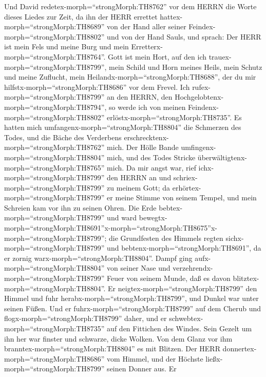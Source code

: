  Und David redetex-morph=``strongMorph:TH8762'' vor dem
HERRN die Worte dieses Liedes zur Zeit, da ihn der HERR errettet
hattex-morph=``strongMorph:TH8689'' von der Hand aller seiner
Feindex-morph=``strongMorph:TH8802'' und von der Hand Sauls, und sprach:
 Der HERR ist mein Fels und meine Burg und mein
Erretterx-morph=``strongMorph:TH8764''.  Gott ist mein Hort,
auf den ich trauex-morph=``strongMorph:TH8799'', mein Schild und Horn
meines Heils, mein Schutz und meine Zuflucht, mein
Heilandx-morph=``strongMorph:TH8688'', der du mir
hilfstx-morph=``strongMorph:TH8686'' vor dem Frevel.  Ich
rufex-morph=``strongMorph:TH8799'' an den HERRN, den
Hochgelobtenx-morph=``strongMorph:TH8794'', so werde ich von meinen
Feindenx-morph=``strongMorph:TH8802''
erlöstx-morph=``strongMorph:TH8735''.  Es hatten mich
umfangenx-morph=``strongMorph:TH8804'' die Schmerzen des Todes, und die
Bäche des Verderbens erschrecktenx-morph=``strongMorph:TH8762'' mich.
 Der Hölle Bande umfingenx-morph=``strongMorph:TH8804''
mich, und des Todes Stricke überwältigtenx-morph=``strongMorph:TH8765''
mich.  Da mir angst war, rief
ichx-morph=``strongMorph:TH8799'' den HERRN an und
schriex-morph=``strongMorph:TH8799'' zu meinem Gott; da
erhörtex-morph=``strongMorph:TH8799'' er meine Stimme von seinem Tempel,
und mein Schreien kam vor ihn zu seinen Ohren.  Die Erde
bebtex-morph=``strongMorph:TH8799'' und ward
bewegtx-morph=``strongMorph:TH8691''\textbar x-morph=``strongMorph:TH8675''x-morph=``strongMorph:TH8799'';
die Grundfesten des Himmels regten sichx-morph=``strongMorph:TH8799''
und bebtenx-morph=``strongMorph:TH8691'', da er zornig
warx-morph=``strongMorph:TH8804''.  Dampf ging
aufx-morph=``strongMorph:TH8804'' von seiner Nase und
verzehrendx-morph=``strongMorph:TH8799'' Feuer von seinem Munde, daß es
davon blitztex-morph=``strongMorph:TH8804''.  Er
neigtex-morph=``strongMorph:TH8799'' den Himmel und fuhr
herabx-morph=``strongMorph:TH8799'', und Dunkel war unter seinen Füßen.
 Und er fuhrx-morph=``strongMorph:TH8799'' auf dem Cherub
und flogx-morph=``strongMorph:TH8799'' daher, und er
schwebtex-morph=``strongMorph:TH8735'' auf den Fittichen des Windes.
 Sein Gezelt um ihn her war finster und schwarze, dicke
Wolken.  Von dem Glanz vor ihm
branntex-morph=``strongMorph:TH8804'' es mit Blitzen.  Der
HERR donnertex-morph=``strongMorph:TH8686'' vom Himmel, und der Höchste
ließx-morph=``strongMorph:TH8799'' seinen Donner aus.  Er
